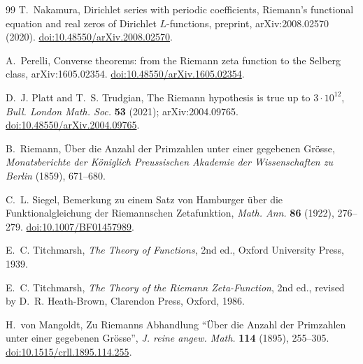 \documentclass[11pt,reqno]{amsart}
\numberwithin{equation}{section}
\theoremstyle{plain}
\theoremstyle{definition}
\theoremstyle{remark}
\begin{document}
\begin{thebibliography}{99}
T.~Nakamura, Dirichlet series with periodic coefficients, Riemann's functional equation and real zeros of Dirichlet $L$-functions, preprint, arXiv:2008.02570 (2020).
\href{https://doi.org/10.48550/arXiv.2008.02570}{doi:10.48550/arXiv.2008.02570}.

A.~Perelli, Converse theorems: from the Riemann zeta function to the Selberg class, arXiv:1605.02354.
\href{https://doi.org/10.48550/arXiv.1605.02354}{doi:10.48550/arXiv.1605.02354}.

D.~J. Platt and T.~S. Trudgian, The Riemann hypothesis is true up to $3\cdot10^{12}$, \emph{Bull. London Math. Soc.} \textbf{53} (2021); arXiv:2004.09765.
\href{https://doi.org/10.48550/arXiv.2004.09765}{doi:10.48550/arXiv.2004.09765}.

B.~Riemann, \"Uber die Anzahl der Primzahlen unter einer gegebenen Gr\"osse, \emph{Monatsberichte der K\"oniglich Preussischen Akademie der Wissenschaften zu Berlin} (1859), 671--680.

C.~L. Siegel, Bemerkung zu einem Satz von Hamburger \"uber die Funktionalgleichung der Riemannschen Zetafunktion, \emph{Math. Ann.} \textbf{86} (1922), 276--279.
\href{https://doi.org/10.1007/BF01457989}{doi:10.1007/BF01457989}.

E.~C. Titchmarsh, \emph{The Theory of Functions}, 2nd ed., Oxford University Press, 1939.

E.~C. Titchmarsh, \emph{The Theory of the Riemann Zeta-Function}, 2nd ed., revised by D.~R. Heath-Brown, Clarendon Press, Oxford, 1986.

H.~von Mangoldt, Zu Riemanns Abhandlung ``\"Uber die Anzahl der Primzahlen unter einer gegebenen Gr\"osse'', \emph{J. reine angew. Math.} \textbf{114} (1895), 255--305.
\href{https://doi.org/10.1515/crll.1895.114.255}{doi:10.1515/crll.1895.114.255}.

\end{thebibliography}
\end{document}

